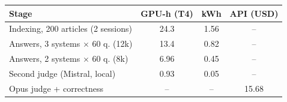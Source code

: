 \begin{tabular}{lccc}
\toprule
Stage & GPU-h (T4) & kWh & API (USD) \\
\midrule
Indexing, 200 articles (2 sessions) & 24.3 & 1.56 & -- \\
Answers, 3 systems $\times$ 60 q. (12k) & 13.4 & 0.82 & -- \\
Answers, 2 systems $\times$ 60 q. (8k) & 6.96 & 0.45 & -- \\
Second judge (Mistral, local) & 0.93 & 0.05 & -- \\
Opus judge + correctness & -- & -- & 15.68 \\
\bottomrule
\end{tabular}
